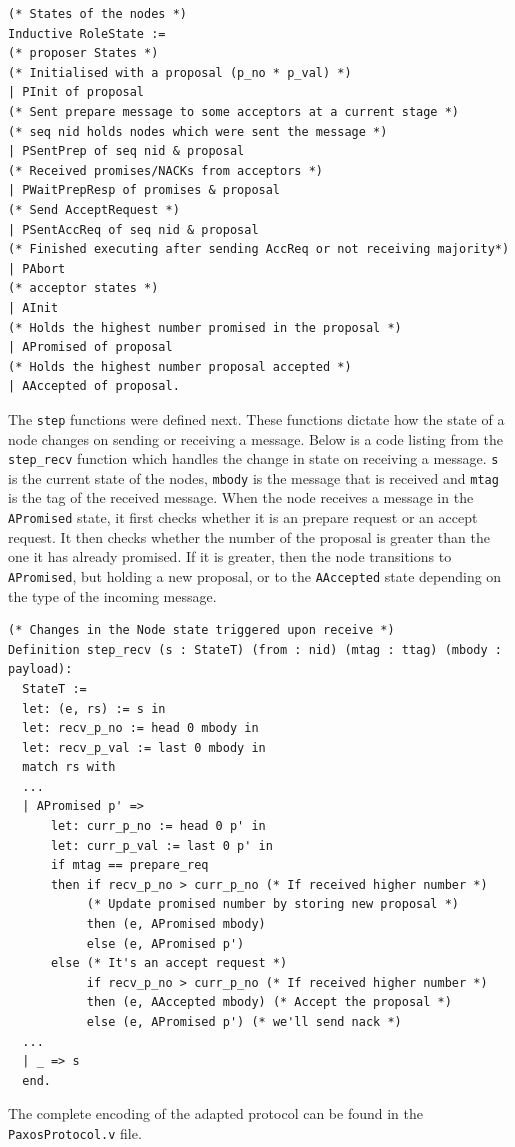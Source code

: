\begin{lstlisting}
(* States of the nodes *)
Inductive RoleState :=
(* proposer States *)
(* Initialised with a proposal (p_no * p_val) *)
| PInit of proposal
(* Sent prepare message to some acceptors at a current stage *)
(* seq nid holds nodes which were sent the message *)
| PSentPrep of seq nid & proposal
(* Received promises/NACKs from acceptors *)
| PWaitPrepResp of promises & proposal
(* Send AcceptRequest *)
| PSentAccReq of seq nid & proposal
(* Finished executing after sending AccReq or not receiving majority*)
| PAbort
(* acceptor states *)
| AInit
(* Holds the highest number promised in the proposal *)
| APromised of proposal
(* Holds the highest number proposal accepted *)
| AAccepted of proposal.
\end{lstlisting}

The \texttt{step} functions were defined next. These functions dictate how the state
of a node changes on sending or receiving a message. Below is a code listing
from the \texttt{step\_recv} function which handles the change in state on
receiving a message. \texttt{s} is the current state of the nodes,
\texttt{mbody} is the message that is received and \texttt{mtag} is the tag
of the received message. When the node receives a message in the \texttt{APromised}
state, it first checks whether it is an prepare request or an accept request.
It then checks whether the number of the proposal is greater than the one it has
already promised. If it is greater, then the node transitions to \texttt{APromised},
but holding a new proposal, or to the \texttt{AAccepted} state depending on the
type of the incoming message.

\begin{lstlisting}
(* Changes in the Node state triggered upon receive *)
Definition step_recv (s : StateT) (from : nid) (mtag : ttag) (mbody : payload):
  StateT :=
  let: (e, rs) := s in
  let: recv_p_no := head 0 mbody in
  let: recv_p_val := last 0 mbody in
  match rs with
  ...
  | APromised p' =>
      let: curr_p_no := head 0 p' in
      let: curr_p_val := last 0 p' in
      if mtag == prepare_req
      then if recv_p_no > curr_p_no (* If received higher number *)
           (* Update promised number by storing new proposal *)
           then (e, APromised mbody)
           else (e, APromised p')
      else (* It's an accept request *)
           if recv_p_no > curr_p_no (* If received higher number *)
           then (e, AAccepted mbody) (* Accept the proposal *)
           else (e, APromised p') (* we'll send nack *)
  ...
  | _ => s
  end.
\end{lstlisting}

The complete encoding of the adapted protocol can be found in the
\texttt{PaxosProtocol.v} file.
